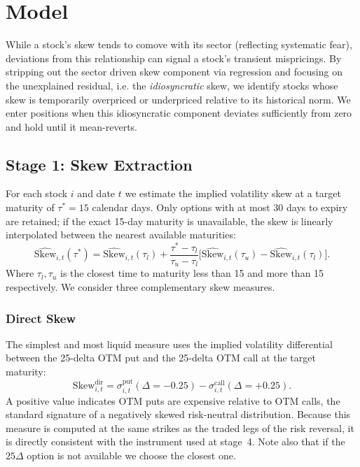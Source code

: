 \documentclass[12pt, a4paper]{article}
\begin{document}
\section{Model}

While a stock's skew tends to comove with its sector (reflecting systematic fear), deviations from this relationship can signal a stock's transient mispricings. By stripping out the sector driven skew component via regression and focusing on the unexplained residual, i.e. the \emph{idiosyncratic} skew, we identify stocks whose skew is temporarily overpriced or underpriced relative to its historical norm. We enter positions when this idiosyncratic component deviates sufficiently from zero and hold until it mean-reverts.

\subsection{Stage 1: Skew Extraction}
\label{sec:skew_extraction}

For each stock $i$ and date $t$ we estimate the implied volatility skew at a target maturity of $\tau^* = 15$ calendar days. Only options with at most 30 days to expiry are retained; if the exact 15-day maturity is unavailable, the skew is linearly interpolated between the nearest available maturities:
\begin{equation}
    \widehat{\mathrm{Skew}}_{i,t}(\tau^*)
    = \widehat{\mathrm{Skew}}_{i,t}(\tau_l)
      + \frac{\tau^* - \tau_l}{\tau_u - \tau_l}
        \bigl[\widehat{\mathrm{Skew}}_{i,t}(\tau_u)
              - \widehat{\mathrm{Skew}}_{i,t}(\tau_l)\bigr].
    \label{eq:interp}
\end{equation}
Where $\tau_l, \tau_u$ is the closest time to maturity less than 15 and more than 15 respectively. We consider three complementary skew measures.

\subsubsection{Direct Skew}

The simplest and most liquid measure uses the implied volatility differential
between the 25-delta OTM put and the 25-delta OTM call at the target maturity:
\begin{equation}
    \mathrm{Skew}^{\mathrm{dir}}_{i,t}
    = \sigma^{\mathrm{put}}_{i,t}(\Delta = -0.25)
      - \sigma^{\mathrm{call}}_{i,t}(\Delta = +0.25).
    \label{eq:skew_direct}
\end{equation}
A positive value indicates OTM puts are expensive relative to OTM calls, the standard signature of a negatively skewed risk-neutral distribution. Because this measure is computed at the same strikes as the traded legs of the risk reversal, it is directly consistent with the instrument used at stage~4. Note also that if the $25\Delta$ option is not available we choose the closest one.
\end{document}
